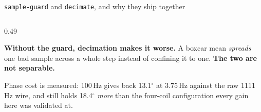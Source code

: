 \documentclass[aspectratio=169]{beamer}
\begin{document}
\begin{frame}{\texttt{sample-guard} and \texttt{decimate}, and why they ship together}
\begin{columns}[T]
\begin{column}{0.49\textwidth}
      \vspace{1.5mm}
      \raggedright
      \alert{\textbf{Without the guard, decimation makes it worse.}} A boxcar
      mean \emph{spreads} one bad sample across a whole step instead of
      confining it to one. \textbf{The two are not separable.}

      \vspace{1.5mm}
      {\scriptsize Phase cost is measured: 100\,Hz gives back 13.1$^\circ$ at
      3.75\,Hz against the raw 1111\,Hz wire, and still holds 18.4$^\circ$ \emph{more} than
      the four-coil configuration every gain here was validated at.}
    \end{column}
  \end{columns}
\end{frame}

\end{document}
